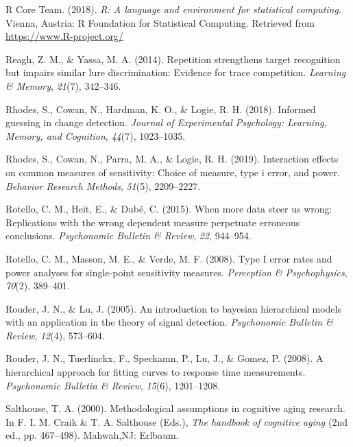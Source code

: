 \documentclass[
  english,
  ,man,floatsintext]{apa6}
\begin{document}
\leavevmode\hypertarget{ref-rteam}{}%
R Core Team. (2018). \emph{R: A language and environment for statistical computing}. Vienna, Austria: R Foundation for Statistical Computing. Retrieved from \url{https://www.R-project.org/}

\leavevmode\hypertarget{ref-ReaghAndYassa2014}{}%
Reagh, Z. M., \& Yassa, M. A. (2014). Repetition strengthens target recognition but impairs similar lure discrimination: Evidence for trace competition. \emph{Learning \& Memory}, \emph{21}(7), 342--346.

\leavevmode\hypertarget{ref-RhodesEtAl2018}{}%
Rhodes, S., Cowan, N., Hardman, K. O., \& Logie, R. H. (2018). Informed guessing in change detection. \emph{Journal of Experimental Psychology: Learning, Memory, and Cognition}, \emph{44}(7), 1023--1035.

\leavevmode\hypertarget{ref-rhodes2019interaction}{}%
Rhodes, S., Cowan, N., Parra, M. A., \& Logie, R. H. (2019). Interaction effects on common measures of sensitivity: Choice of measure, type i error, and power. \emph{Behavior Research Methods}, \emph{51}(5), 2209--2227.

\leavevmode\hypertarget{ref-RotelloEtAl2015}{}%
Rotello, C. M., Heit, E., \& Dubé, C. (2015). When more data steer us wrong: Replications with the wrong dependent measure perpetuate erroneous conclusions. \emph{Psychonomic Bulletin \& Review}, \emph{22}, 944--954.

\leavevmode\hypertarget{ref-RotelloEtAl2008}{}%
Rotello, C. M., Masson, M. E., \& Verde, M. F. (2008). Type I error rates and power analyses for single-point sensitivity measures. \emph{Perception \& Psychophysics}, \emph{70}(2), 389--401.

\leavevmode\hypertarget{ref-rouder2005introduction}{}%
Rouder, J. N., \& Lu, J. (2005). An introduction to bayesian hierarchical models with an application in the theory of signal detection. \emph{Psychonomic Bulletin \& Review}, \emph{12}(4), 573--604.

\leavevmode\hypertarget{ref-RouderEtAl2008rt}{}%
Rouder, J. N., Tuerlinckx, F., Speckamn, P., Lu, J., \& Gomez, P. (2008). A hierarchical approach for fitting curves to response time measurements. \emph{Psychonomic Bulletin \& Review}, \emph{15}(6), 1201--1208.

\leavevmode\hypertarget{ref-Salthouse2000}{}%
Salthouse, T. A. (2000). Methodological assumptions in cognitive aging research. In F. I. M. Craik \& T. A. Salthouse (Eds.), \emph{The handbook of cognitive aging} (2nd ed., pp. 467--498). Mahwah,NJ: Erlbaum.
\end{document}
